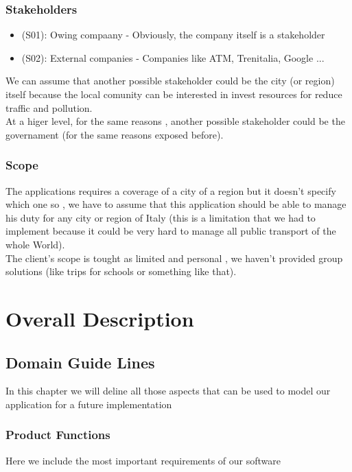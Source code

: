 \documentclass[a4paper]{book}
\begin{document}
\section{Stakeholders}
\begin{itemize}

\item (S01): Owing compaany - Obviously, the company itself is a stakeholder
\item (S02): External companies - Companies like ATM, Trenitalia, Google ...

\end{itemize}

We can assume that another possible stakeholder could be the city (or region) itself because the local comunity can be interested in invest resources for reduce traffic and pollution.\\

At a higer level, for the same reasons , another possible stakeholder could be the governament (for the same reasons exposed before).

\section{Scope}

The applications requires a coverage of a city of a region but it doesn't specify which one so , we have to assume that this application should be able to manage his duty for any city or region of Italy (this is a limitation that we had to implement because it could be very hard to manage all public transport of the whole World).\\

The client's scope is tought as limited and personal , we haven't provided group solutions (like trips for schools or something like that).

\part{Overall Description}

\chapter{Domain Guide Lines}
In this chapter we will deline all those aspects that can be used to model our application for a future implementation

\section{Product Functions}
Here we include the most important requirements of our software
\end{document}
